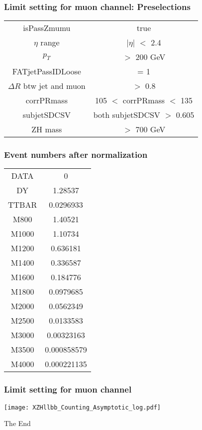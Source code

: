 \documentclass{beamer}
\begin{document}
\begin{frame}
  \frametitle{Limit setting for muon channel: Preselections}
  \justifying
  \begin{footnotesize}
    \begin{center}
      \begin{tabular}{ | c | c | }
        \hline
        isPassZmumu & true \\
        $\eta$ range & $|\eta|$ $<$ 2.4 \\
        $p_T$        & $>$ 200 GeV      \\
        FATjetPassIDLoose & = 1 \\
        $\Delta R$ btw jet and muon & $>$ 0.8 \\
        corrPRmass & 105 $<$ corrPRmass $<$ 135 \\
        subjetSDCSV & both subjetSDCSV $>$ 0.605 \\
        ZH mass & $>$ 700 GeV \\
        \hline
      \end{tabular}
    \end{center}
  \end{footnotesize}
\end{frame}

\begin{frame}
  \frametitle{Event numbers after normalization}
  \justifying
  \begin{footnotesize}
    \begin{center}
      \begin{tabular}{ | c | c | }
        \hline
        DATA  &	0 \\
        DY    &	1.28537 \\
        TTBAR &	0.0296933 \\
        M800  &	1.40521 \\
        M1000 &	1.10734 \\
        M1200 &	0.636181 \\
        M1400 &	0.336587 \\
        M1600 &	0.184776 \\
        M1800 &	0.0979685 \\
        M2000 &	0.0562349 \\
        M2500 &	0.0133583 \\
        M3000 &	0.00323163 \\
        M3500 &	0.000858579 \\
        M4000 &	0.000221135 \\
        \hline
      \end{tabular}
    \end{center}
  \end{footnotesize}
\end{frame}

\begin{frame}
  \frametitle{Limit setting for muon channel}
  \begin{center}
    \texttt{[image: XZHllbb\_Counting\_Asymptotic\_log.pdf]}
  \end{center}
\end{frame}

\begin{frame}
  \Huge{\centerline{The End}}
\end{frame}
\end{document}
